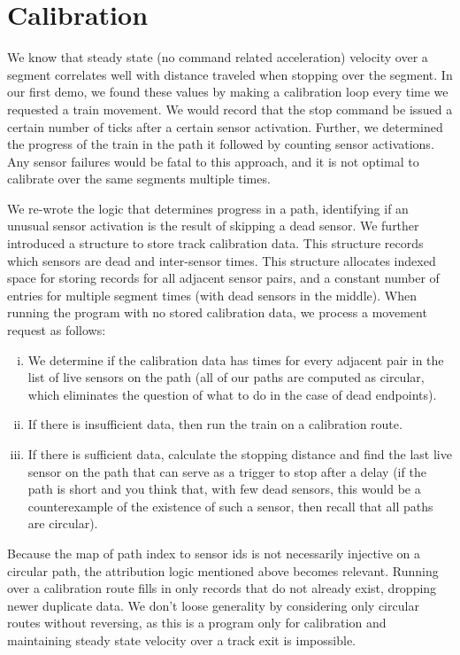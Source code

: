 \documentclass{amsart} \usepackage{amsmath} \usepackage{upgreek}
\begin{document}
\section*{Calibration}

We know that steady state (no command related acceleration) velocity over a segment correlates well with distance traveled when stopping over the segment. In our first demo, we found these values by making a calibration loop every time we requested a train movement. We would record that the stop command be issued a certain number of ticks after a certain sensor activation. Further, we determined the progress of the train in the path it followed by counting sensor activations. Any sensor failures would be fatal to this approach, and it is not optimal to calibrate over the same segments multiple times.

We re-wrote the logic that determines progress in a path, identifying if an unusual sensor activation is the result of skipping a dead sensor. We further introduced a structure to store track calibration data. This structure records which sensors are dead and inter-sensor times. This structure allocates indexed space for storing records for all adjacent sensor pairs, and a constant number of entries for multiple segment times (with dead sensors in the middle). When running the program with no stored calibration data, we process a movement request as follows:
\begin{enumerate}[i.]
    \item We determine if the calibration data has times for every adjacent pair in the list of live sensors on the path (all of our paths are computed as circular, which eliminates the question of what to do in the case of dead endpoints).
    \item If there is insufficient data, then run the train on a calibration route.
    \item If there is sufficient data, calculate the stopping distance and find the last live sensor on the path that can serve as a trigger to stop after a delay (if the path is short and you think that, with few dead sensors, this would be a counterexample of the existence of such a sensor, then recall that all paths are circular).
\end{enumerate}
Because the map of path index to sensor ids is not necessarily injective on a circular path, the attribution logic mentioned above becomes relevant. Running over a calibration route fills in only records that do not already exist, dropping newer duplicate data. We don't loose generality by considering only circular routes without reversing, as this is a program only for calibration and maintaining steady state velocity over a track exit is impossible.
\end{document}
